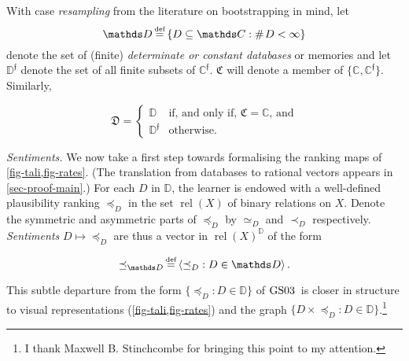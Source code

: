 \documentclass[ecta,nameyear,draft]{econsocart}
\newcommand{\countof}{\mathbin{\#}\hskip1pt}
\newcommand\defeq{\mathrel{\overset{\makebox[0pt]{\mbox{\normalfont\tiny def}}}{=}}}%
\newcommand{\relations}{\operatorname{rel}}
\newcommand{\novel}{\mathfrak f}
\newcommand{\precb}{\mathbin{\prec}}
\newcommand{\preceqb}{\mathbin{\preceq}}
\newcommand{\mbbd}{{\mathds D}}
\newcommand{\mbbdp}{{\mathds D^{\novel}}}
\newcommand{\dpp}{{\mathfrak D}}
\newcommand{\mbbc}{{\mathds C}}
\newcommand{\mbbcp}{{\mathds C^{\novel}}}
\newcommand{\cpp}{{\mathfrak C}}
\newcommand{\lbc}{\left\{}
\newcommand{\rbc}{\right\}}
\newcommand{\gsii}{$\textup{GS03}$}
\theoremstyle{plain}
\theoremstyle{remark}
\begin{document}
With case \emph{resampling} from the literature on bootstrapping in mind, let
\begin{equation*}
  \mbbd\defeq \lbc D\subseteq \mbbc: \countof D < \infty \rbc
\end{equation*} denote the set of (finite) \emph{determinate or constant
databases} or memories and let $\mbbdp$ denote the set of all
finite subsets of $\mbbcp$. $\cpp$ will denote a member of $\{\mbbc, \mbbcp\}$.
Similarly, 
\begin{linenomath*} \begin{equation*} \text{$\dpp$} = \left\{\begin{array}{ll}
    \mbbd & \text{if, and only if, $\cpp = \mbbc$, and}\\ \mbbdp &
\text{otherwise.} \end{array}\right.  \end{equation*}
\end{linenomath*}

\emph{Sentiments.} We now take a first step towards formalising the ranking
maps of \cref{fig-tali,fig-rates}.  (The translation from databases to
rational vectors appears in \cref{sec-proof-main}.) For each $D$ in $\mbbd$, the
learner is endowed with a well-defined plausibility ranking $\preceqb_D$ in the
set $\relations(X)$ of binary relations on $X$.  Denote the symmetric and
asymmetric parts of $\preceqb_D$ by $\simeq _D$ and $\precb_D$ respectively. 
\emph{Sentiments} $D \mapsto \preceqb_{D}$ are thus a vector in
$\relations(X)^{\mbbd}$ of the form
\begin{linenomath*}
  \begin{equation*}\preceqb_{\mbbd} \defeq \langle\preceqb_{D} : D\in
  \mbbd\rangle\,.\end{equation*}
\end{linenomath*}
This subtle departure from the form $\{\preceqb_{D} : D \in \mbbd\}$ of \gsii\
is closer in structure to visual representations (\cref{fig-tali,fig-rates})
and the graph $\{D \times \preceqb_{D} : D \in \mbbd\}$.\footnote{I thank
Maxwell B.  Stinchcombe for bringing this point to my attention.}
\end{document}
